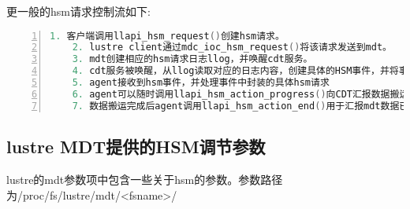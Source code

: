 更一般的hsm请求控制流如下: 
\begin{lstlisting}[language={c++},numbers=left]
    1. 客户端调用llapi_hsm_request()创建hsm请求。 
    2. lustre client通过mdc_ioc_hsm_request()将该请求发送到mdt。 
    3. mdt创建相应的hsm请求日志llog，并唤醒cdt服务。 
    4. cdt服务被唤醒，从llog读取对应的日志内容，创建具体的HSM事件，并将事件发送到agent所在的客户端。 
    5. agent接收到hsm事件，并处理事件中封装的具体hsm请求
    6. agent可以随时调用llapi_hsm_action_progress()向CDT汇报数据搬运的进度。 
    7. 数据搬运完成后agent调用llapi_hsm_action_end()用于汇报mdt数据已搬运完成。 
\end{lstlisting}

\subsection{lustre MDT提供的HSM调节参数}

lustre的mdt参数项中包含一些关于hsm的参数。参数路径为/proc/fs/lustre/mdt/<fsname>/ 

